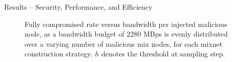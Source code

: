 \documentclass[final]{beamer}
\newlength{\maincolwidth}
\begin{document}
\begin{frame}[t]
\begin{columns}[t]
\begin{column}{\maincolwidth}
 \begin{alertblock}{Results -- Security, Performance, and Efficiency}
    \begin{minipage}[t]{0.95\maincolwidth}
      \vspace{-1cm}
      \begin{figure}[t!]
        \centering
    \caption{Fully compromised rate versus bandwidth per injected malicious node, as a bandwidth budget of 
    $2280$ MBps is evenly distributed over a varying number of malicious mix nodes, for each mixnet 
    construction strategy. $h$ denotes the threshold at sampling step.}
      \end{figure}
      \vspace{1cm}
\begin{figure}[t!]
    \centering

\end{figure}
\end{minipage}
\end{alertblock}
\end{column}
\end{columns}
\end{frame}
\end{document}
